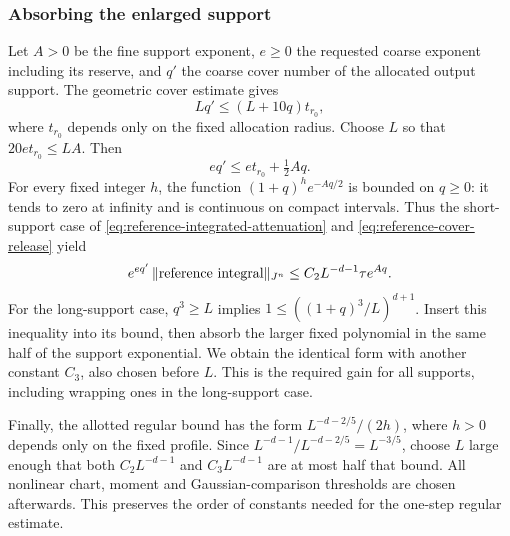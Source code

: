 \subsubsection{Absorbing the enlarged support}
Let $A>0$ be the fine support exponent, $e\ge0$ the requested
coarse exponent including its reserve, and $q'$ the coarse
cover number of the allocated output support. The geometric
cover estimate gives
\[
 Lq'\le(L+10q)t_{r_0},
\]
where $t_{r_0}$ depends only on the fixed allocation radius.
Choose $L$ so that $20e t_{r_0}\le LA$. Then
\begin{equation}\label{eq:reference-cover-release}
 eq'\le e t_{r_0}+\tfrac12 A q.
\end{equation}
For every fixed integer $h$, the function
$(1+q)^h e^{-Aq/2}$ is bounded on $q\ge0$: it tends to zero
at infinity and is continuous on compact intervals. Thus the
short-support case of \eqref{eq:reference-integrated-attenuation}
and \eqref{eq:reference-cover-release} yield
\[
 e^{eq'}\,\|\hbox{reference integral}\|_{J^n}
                  \le C_2L^{-d-1}\tau e^{Aq}.
\]
For the long-support case, $q^3\ge L$ implies
$1\le((1+q)^3/L)^{d+1}$. Insert this inequality into its
bound, then absorb the larger fixed polynomial in the same
half of the support exponential. We obtain the identical form
with another constant $C_3$, also chosen before $L$.
This is the required gain for all supports, including wrapping
ones in the long-support case.

Finally, the allotted regular bound has the form
$L^{-d-2/5}/(2h)$, where $h>0$ depends only on the fixed
profile. Since $L^{-d-1}/L^{-d-2/5}=L^{-3/5}$, choose $L$
large enough that both $C_2L^{-d-1}$ and $C_3L^{-d-1}$ are
at most half that bound. All nonlinear chart, moment and
Gaussian-comparison thresholds are chosen afterwards. This
preserves the order of constants needed for the one-step
regular estimate.
